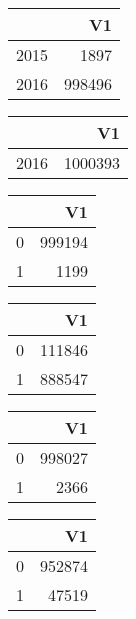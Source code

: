 \bigskip\bigskip
\centering
\begin{tabular}{rr}
  \hline
 & V1 \\ 
  \hline
2015 & 1897 \\ 
  2016 & 998496 \\ 
   \hline
\end{tabular}

\bigskip\bigskip
\centering
\begin{tabular}{rr}
  \hline
 & V1 \\ 
  \hline
2016 & 1000393 \\ 
   \hline
\end{tabular}

\bigskip\bigskip
\centering
\begin{tabular}{rr}
  \hline
 & V1 \\ 
  \hline
0 & 999194 \\ 
  1 & 1199 \\ 
   \hline
\end{tabular}

\bigskip\bigskip
\centering
\begin{tabular}{rr}
  \hline
 & V1 \\ 
  \hline
0 & 111846 \\ 
  1 & 888547 \\ 
   \hline
\end{tabular}

\bigskip\bigskip
\centering
\begin{tabular}{rr}
  \hline
 & V1 \\ 
  \hline
0 & 998027 \\ 
  1 & 2366 \\ 
   \hline
\end{tabular}

\bigskip\bigskip
\centering
\begin{tabular}{rr}
  \hline
 & V1 \\ 
  \hline
0 & 952874 \\ 
  1 & 47519 \\ 
   \hline
\end{tabular}

